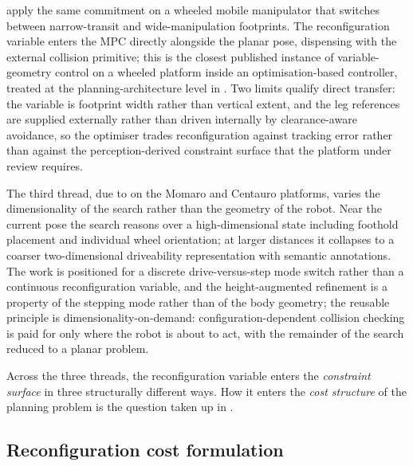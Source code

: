 \documentclass[11pt,a4paper]{article}
\begin{document}
\citet{pankertDesignMotionPlanning2022} apply the same commitment on a wheeled mobile manipulator that switches between narrow-transit and wide-manipulation footprints. The reconfiguration variable enters the MPC directly alongside the planar pose, dispensing with the external collision primitive; this is the closest published instance of variable-geometry control on a wheeled platform inside an optimisation-based controller, treated at the planning-architecture level in . Two limits qualify direct transfer: the variable is footprint width rather than vertical extent, and the leg references are supplied externally rather than driven internally by clearance-aware avoidance, so the optimiser trades reconfiguration against tracking error rather than against the perception-derived constraint surface that the platform under review requires.

The third thread, due to \citet{klamtPlanningHybridDrivingStepping2018} on the Momaro and Centauro platforms, varies the dimensionality of the search rather than the geometry of the robot. Near the current pose the search reasons over a high-dimensional state including foothold placement and individual wheel orientation; at larger distances it collapses to a coarser two-dimensional driveability representation with semantic annotations. The work is positioned for a discrete drive-versus-step mode switch rather than a continuous reconfiguration variable, and the height-augmented refinement is a property of the stepping mode rather than of the body geometry; the reusable principle is dimensionality-on-demand: configuration-dependent collision checking is paid for only where the robot is about to act, with the remainder of the search reduced to a planar problem.

Across the three threads, the reconfiguration variable enters the \emph{constraint surface} in three structurally different ways. How it enters the \emph{cost structure} of the planning problem is the question taken up in .

\subsection{Reconfiguration cost formulation}
\label{sec:sq3:cost}
\end{document}
